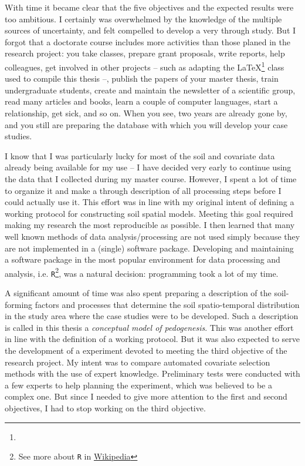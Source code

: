 With time it became clear that the five objectives and the expected results were too ambitious. I certainly 
was overwhelmed by the knowledge of the multiple sources of uncertainty, and felt compelled to develop a very 
through study. But I forgot that a doctorate course includes more activities than those planed in the 
research project: you take classes, prepare grant proposals, write reports, help colleagues, get involved in 
other projects -- such as adapting the \LaTeX{}\footnote{\footlatex} class used to compile this thesis --, 
publish the papers of your master thesis, train undergraduate students, create and maintain the newsletter of 
a scientific group, read many articles and books, learn a couple of computer languages, start a relationship, 
get sick, and so on. When you see, two years are already gone by, and you still are preparing the database with 
which you will develop your case studies.

\def\footr{See more about \texttt{R} in 
\href{https://en.wikipedia.org/wiki/R_\%28programming_language\%29}{Wikipedia}}

I know that I was particularly lucky for most of the soil and covariate data already being available for my 
use -- I have decided very early to continue using the data that I collected during my master course. However, 
I spent a lot of time to organize it and make a through description of all processing steps before I could 
actually use it. This effort was in line with my original intent of defining a working protocol for 
constructing soil spatial models. Meeting this goal required making my research the most reproducible as 
possible. I then learned that many well known methods of data analysis/processing are not used simply because 
they are not implemented in a (single) software package. Developing and maintaining a software package in the 
most popular environment for data processing and analysis, i.e. \texttt{R}\footnote{\footr}, was a natural 
decision: programming took a lot of my time.

A significant amount of time was also spent preparing a description of the soil-forming factors and processes
that determine the soil spatio-temporal distribution in the study area where the case studies were to be 
developed. Such a description is called in this thesis a \emph{conceptual model of pedogenesis}. This was 
another effort in line with the definition of a working protocol. But it was also expected to serve the 
development of a experiment devoted to meeting the third objective of the research project. My intent was to 
compare automated covariate selection methods with the use of expert knowledge. Preliminary tests were 
conducted with a few experts to help planning the experiment, which was believed to be a complex one. But 
since I needed to give more attention to the first and second objectives, I had to stop working on the third 
objective.

